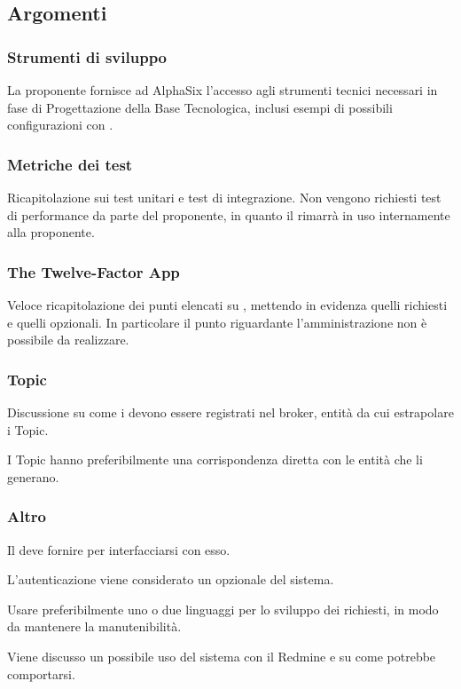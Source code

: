         \subsection{Argomenti}
            \subsubsection{Strumenti di sviluppo}
            La proponente fornisce ad AlphaSix l'accesso agli strumenti tecnici necessari in fase di Progettazione della Base Tecnologica, inclusi esempi di possibili configurazioni con .

            \subsubsection{Metriche dei test}
            Ricapitolazione sui test unitari e test di integrazione. Non vengono richiesti test di performance da parte del proponente, in quanto il  rimarrà in uso internamente alla proponente.
            
            \subsubsection{The Twelve-Factor App}
            Veloce ricapitolazione dei punti elencati su , mettendo in evidenza quelli richiesti e quelli opzionali. In particolare il punto riguardante l'amministrazione non è possibile da realizzare.
            
            \subsubsection{Topic}
            Discussione su come i  devono essere registrati nel broker, entità da cui estrapolare i Topic.\par
            I Topic hanno preferibilmente una corrispondenza diretta con le entità che li generano.            
            
            \subsubsection{Altro}
            Il  deve fornire  per interfacciarsi con esso.\par
            L'autenticazione viene considerato un  opzionale del sistema.\par
            Usare preferibilmente uno o due linguaggi per lo sviluppo dei  richiesti, in modo da mantenere la manutenibilità.\par
            Viene discusso un possibile uso del sistema con il  Redmine e su come potrebbe comportarsi.
            

